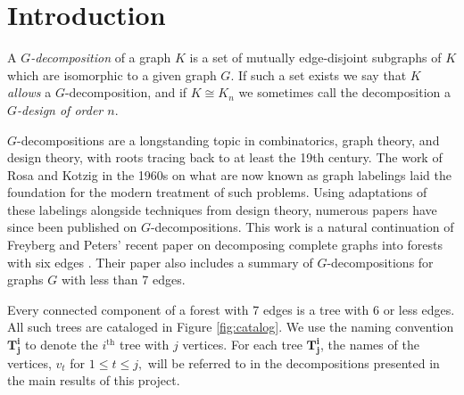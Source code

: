\chapter{Introduction} \label{chap:intro}
\label{intro_chapter}
A \textit{$G$-decomposition} of a graph $K$ is a set of mutually edge-disjoint subgraphs of $K$ which are isomorphic to a given graph $G$. If such a set exists we say that $K$ \textit{allows} a $G$-decomposition, and if $K\cong K_{n}$ we sometimes call the decomposition a \textit{$G$-design of order $n$}.

$G$-decompositions are a longstanding topic in combinatorics, graph theory, and design theory, with roots tracing back to at least the 19th century. The work of Rosa and Kotzig in the 1960s on what are now known as graph labelings laid the foundation for the modern treatment of such problems. Using adaptations of these labelings alongside techniques from design theory, numerous papers have since been published on $G$-decompositions. This work is a natural continuation of Freyberg and Peters' recent paper on decomposing complete graphs into forests with six edges \cite{bib:Peters}. Their paper also includes a summary of $G$-decompositions for graphs $G$ with less than 7 edges.

Every connected component of a forest with 7 edges is a tree with 6 or less edges. All such trees are cataloged in Figure \ref{fig:catalog}. We use the naming convention $\mathbf{T_{j}^i}$ to denote the $i^{\textrm{th}}$ tree with $j$ vertices. For each tree $\mathbf{T_{j}^i}$, the names of the vertices, $v_t$ for $1 \leq t \leq j,$ will be referred to in the decompositions presented in the main results of this project.


